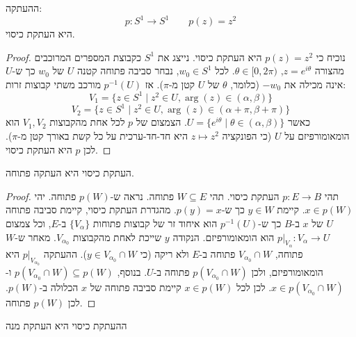 \documentclass{tstextbook}
\begin{document}
\begin{example}
ההעתקה:
$$p:S^{1}\to S^{1}\qquad p(z)=z^{2}$$
היא העתקת כיסוי.

\end{example}
\begin{proof}
נוכיח כי \(p(z)=z^2\) היא העתקת כיסוי. נייצג את \(S^1\) כקבוצת המספרים המרוכבים מהצורה \(z=e^{i\theta}\), \(\theta\in[0,2\pi)\). לכל \(w_0\in S^1\), נבחר סביבה פתוחה קטנה \(U\) של \(w_0\) כך ש-\(U\) אינה מכילה את \(-w_0\) (כלומר, \(\theta\) של \(U\) קטן מ-\(\pi\)). אז \(p^{-1}(U)\) מורכב משתי קבוצות זרות:
$$V_1 = \{z\in S^1 \mid z^2 \in U, \arg(z) \in (\alpha, \beta)\}$$$$V_2 = \{z\in S^1 \mid z^2 \in U, \arg(z) \in (\alpha+\pi, \beta+\pi)\}$$
כאשר \(U = \{e^{i\theta} \mid \theta \in (\alpha, \beta)\}\).
הצמצום של \(p\) לכל אחת מהקבוצות \(V_1, V_2\) הוא הומאומורפיזם על \(U\) (כי הפונקציה \(z\mapsto z^2\) היא חד-חד-ערכית על כל קשת באורך קטן מ-\(\pi\)). לכן \(p\) היא העתקת כיסוי.

\end{proof}
\begin{proposition}
העתקת כיסוי היא העתקה פתוחה.

\end{proposition}
\begin{proof}
תהי \(p:E\to B\) העתקת כיסוי. תהי \(W\subseteq E\) פתוחה. נראה ש-\(p(W)\) פתוחה.
יהי \(x \in p(W)\). קיימת \(y \in W\) כך ש-\(p(y)=x\). מהגדרת העתקת כיסוי, קיימת סביבה פתוחה \(U\) של \(x\) ב-\(B\) כך ש-\(p^{-1}(U)\) הוא איחוד זר של קבוצות פתוחות \(\{V_\alpha\}\) ב-\(E\), וכל צמצום \(p|_{V_\alpha}:V_\alpha \to U\) הוא הומאומורפיזם.
הנקודה \(y\) שייכת לאחת מהקבוצות \(V_{\alpha_0}\). מאחר ש-\(W\) פתוחה, \(V_{\alpha_0} \cap W\) פתוחה ב-\(E\) ולא ריקה (כי \(y \in V_{\alpha_0} \cap W\)). ההעתקה \(p|_{V_{\alpha_0}}\) היא הומאומורפיזם, ולכן \(p(V_{\alpha_0} \cap W)\) פתוחה ב-\(U\).
בנוסף, \(p(V_{\alpha_0} \cap W) \subseteq p(W)\) ו-\(x \in p(V_{\alpha_0} \cap W)\). לכן לכל \(x \in p(W)\) קיימת סביבה פתוחה של \(x\) הכלולה ב-\(p(W)\). לכן \(p(W)\) פתוחה.

\end{proof}
\begin{corollary}
ההעתקת כיסוי היא העתקת מנה

\end{corollary}
\end{document}
